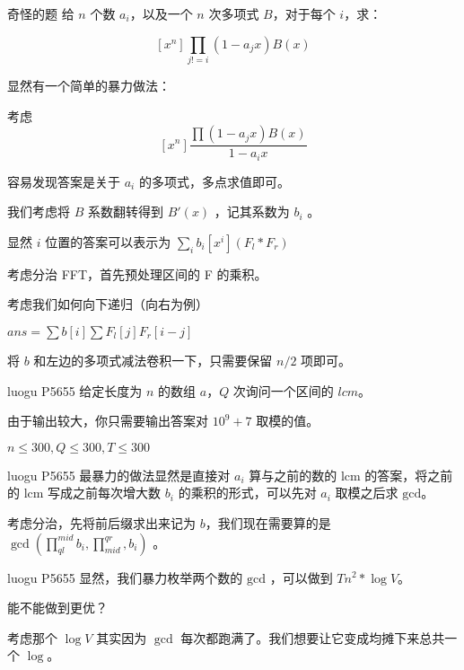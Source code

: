 \documentclass[UTF8,nofonts]{ctexbeamer}
\begin{document}
\begin{frame}{奇怪的题}
给 $n$ 个数 $a_i$，以及一个 $n$ 次多项式 $B$，对于每个 $i$，求：

$$
[x^n]\prod _{j!=i} (1-a_jx) B(x)
$$

\end{frame}

\begin{frame}

显然有一个简单的暴力做法：

考虑
$$
[x^n]\frac {\prod (1-a_jx) B(x)} {1-a_i x}
$$

容易发现答案是关于 $a_i$ 的多项式，多点求值即可。
\end{frame}

\begin{frame}

我们考虑将 $B$ 系数翻转得到 $B'(x)$ ，记其系数为 $b_i$ 。

显然 $i$ 位置的答案可以表示为 $\sum_i b_i [x^i] (F_l *F_r)$

考虑分治 FFT，首先预处理区间的 F 的乘积。

考虑我们如何向下递归（向右为例）

$ans = \sum b[i] \sum F_l[j] F_r[i-j]$

将 $b$ 和左边的多项式减法卷积一下，只需要保留 $n/2$ 项即可。

\end{frame}

\begin{frame}{luogu P5655}
给定长度为 $n$ 的数组 $a$，$Q$ 次询问一个区间的 $lcm$。

由于输出较大，你只需要输出答案对 $10^9+7$ 取模的值。

$n\le 300,Q\le 300, T\le 300$
\end{frame}

\begin{frame}{luogu P5655}
最暴力的做法显然是直接对 $a_i$ 算与之前的数的 $\text{lcm}$ 的答案，将之前的 $\text{lcm} $ 写成之前每次增大数 $b_i$ 的乘积的形式，可以先对 $a_i$ 取模之后求 $\text{gcd}$。\pause

考虑分治，先将前后缀求出来记为 $b $，我们现在需要算的是 $\gcd (\prod_{ql}^{mid} b_i ,\prod_{mid}^{qr},b_i )$ 。
\end{frame}

\begin{frame}{luogu P5655}
显然，我们暴力枚举两个数的 $\text{gcd}$ ，可以做到 $Tn^2*\log V$。\pause

能不能做到更优？

考虑那个 $\log V$ 其实因为 $\gcd$ 每次都跑满了。我们想要让它变成均摊下来总共一个 $\log $。
\end{frame}
\end{document}
